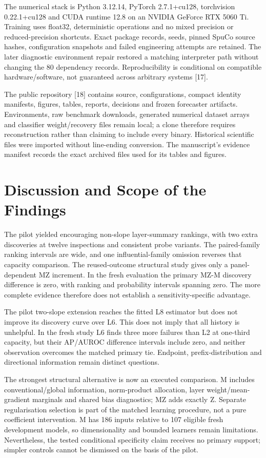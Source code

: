 The numerical stack is Python 3.12.14, PyTorch 2.7.1+cu128, torchvision 0.22.1+cu128 and CUDA runtime 12.8 on an NVIDIA GeForce RTX 5060 Ti. Training uses float32, deterministic operations and no mixed precision or reduced-precision shortcuts. Exact package records, seeds, pinned SpuCo source hashes, configuration snapshots and failed engineering attempts are retained. The later diagnostic environment repair restored a matching interpreter path without changing the 80 dependency records. Reproducibility is conditional on compatible hardware/software, not guaranteed across arbitrary systems [17].

The public repository [18] contains source, configurations, compact identity manifests, figures, tables, reports, decisions and frozen forecaster artifacts. Environments, raw benchmark downloads, generated numerical dataset arrays and classifier weight/recovery files remain local; a clone therefore requires reconstruction rather than claiming to include every binary. Historical scientific files were imported without line-ending conversion. The manuscript's evidence manifest records the exact archived files used for its tables and figures.

\section{Discussion and Scope of the Findings}
\label{sec:discussion}
The pilot yielded encouraging non-slope layer-summary rankings, with two extra discoveries at twelve inspections and consistent probe variants. The paired-family ranking intervals are wide, and one influential-family omission reverses that capacity comparison. The reused-outcome structural study gives only a panel-dependent MZ increment. In the fresh evaluation the primary MZ-M discovery difference is zero, with ranking and probability intervals spanning zero. The more complete evidence therefore does not establish a sensitivity-specific advantage.

The pilot two-slope extension reaches the fitted L8 estimator but does not improve its discovery curve over L6. This does not imply that all history is unhelpful. In the fresh study L6 finds three more failures than L2 at one-third capacity, but their AP/AUROC difference intervals include zero, and neither observation overcomes the matched primary tie. Endpoint, prefix-distribution and directional information remain distinct questions.

The strongest structural alternative is now an executed comparison. M includes conventional/global information, norm-product allocation, layer weight/mean-gradient marginals and shared bias diagnostics; MZ adds exactly Z. Separate regularisation selection is part of the matched learning procedure, not a pure coefficient intervention. M has 186 inputs relative to 107 eligible fresh development models, so dimensionality and bounded learners remain limitations. Nevertheless, the tested conditional specificity claim receives no primary support; simpler controls cannot be dismissed on the basis of the pilot.

